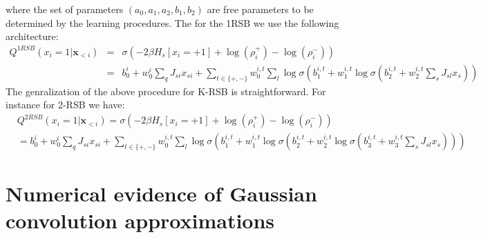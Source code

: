 \documentclass{article}
\begin{document}
where the set of parameters $(a_0, a_1, a_2, b_1, b_2)$ are free parameters to be determined by the learning procedures. The for the 1RSB we use the following architecture:
\begin{eqnarray}
    Q^{1RSB}\left(x_{i}=1|\mathbf{x}_{<i}\right) & = & \sigma\left( 
    -2 \beta H_{s}[x_i = +1] +\log(\rho_i^+) - \log(\rho_i^-)
    \right) \\
    & = & b_0^i + w_0^i\sum_q J_{si} x_{si} + \sum_{t \in \{+,-\}} w_0^{i,t} \sum_l \log\sigma(b_1^{i,t} + w_1^{i,t}\log\sigma(b_2^{i,t} + w_2^{i,t}\sum_{s} J_{sl} x_s))
    \end{eqnarray}
The genralization of the above procedure for K-RSB is straightforward. For instance for 2-RSB we have:
\begin{eqnarray}
    &Q^{2RSB}\left(x_{i}=1|\mathbf{x}_{<i}\right)  =  \sigma\left( 
    -2 \beta H_{s}[x_i = +1] +\log(\rho_i^+) - \log(\rho_i^-)
    \right) \\
    & =  b_0^i + w_0^i\sum_q J_{si} x_{si} + \sum_{t \in \{+,-\}} w_0^{i,t} \sum_l \log\sigma(b_1^{i,t} + w_1^{i,t}\log\sigma(b_2^{i,t} + w_2^{i,t}\log\sigma(b_3^{i,t} + w_3^{i,t}\sum_{s} J_{sl} x_s))) 
    \end{eqnarray}

\section{Numerical evidence of Gaussian convolution approximations}
\end{document}
